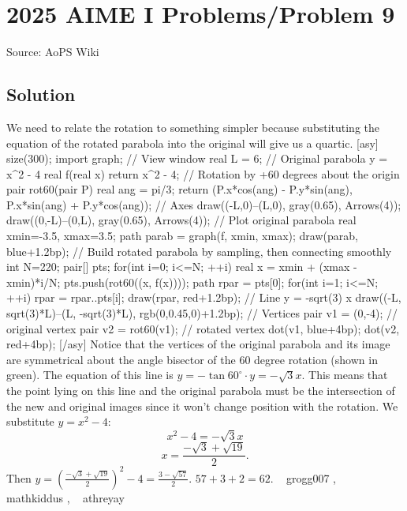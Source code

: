 \documentclass[12pt]{article}
\begin{document}
\section*{{2025 AIME I Problems/Problem 9}}
Source: AoPS Wiki

\subsection*{Solution}
We need to relate the rotation to something simpler because substituting the equation of the rotated parabola into the original will give us a quartic. [asy] size(300); import graph; // View window real L = 6; // Original parabola y = x^2 - 4 real f(real x){ return x^2 - 4; } // Rotation by +60 degrees about the origin pair rot60(pair P){ real ang = pi/3; return (P.x*cos(ang) - P.y*sin(ang), P.x*sin(ang) + P.y*cos(ang)); } // Axes draw((-L,0)--(L,0), gray(0.65), Arrows(4)); draw((0,-L)--(0,L), gray(0.65), Arrows(4)); // Plot original parabola real xmin=-3.5, xmax=3.5; path parab = graph(f, xmin, xmax); draw(parab, blue+1.2bp); // Build rotated parabola by sampling, then connecting smoothly int N=220; pair[] pts; for(int i=0; i<=N; ++i){ real x = xmin + (xmax - xmin)*i/N; pts.push(rot60((x, f(x)))); } path rpar = pts[0]; for(int i=1; i<=N; ++i) rpar = rpar..pts[i]; draw(rpar, red+1.2bp); // Line y = -sqrt(3) x draw((-L, sqrt(3)*L)--(L, -sqrt(3)*L), rgb(0,0.45,0)+1.2bp); // Vertices pair v1 = (0,-4); // original vertex pair v2 = rot60(v1); // rotated vertex dot(v1, blue+4bp); dot(v2, red+4bp); [/asy] Notice that the vertices of the original parabola and its image are symmetrical about the angle bisector of the 60 degree rotation (shown in green). The equation of this line is $y = -\tan60^\circ \cdot y = -\sqrt{3}x.$ This means that the point lying on this line and the original parabola must be the intersection of the new and original images since it won't change position with the rotation. We substitute $y = x^2 - 4:$ \[x^2 - 4 = -\sqrt{3}x\] \[x = \frac{-\sqrt{3} + \sqrt{19}}{2}.\] Then $y = (\frac{-\sqrt{3} + \sqrt{19}}{2})^2 - 4 = \frac{3 - \sqrt{57}}{2}.$ $57 + 3 + 2 = \boxed{62}.$ ~ grogg007 , ~ mathkiddus , ~ athreyay
\end{document}
